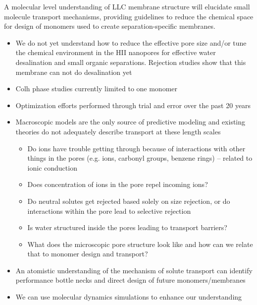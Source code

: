 \documentclass{article}
\begin{document}
	A molecular level understanding of LLC membrane structure will elucidate small molecule transport mechanisms, providing guidelines to reduce the chemical space for design of monomers used to create separation-specific membranes.
	\begin{itemize}
                \item We do not yet understand how to reduce the effective pore size and/or tune the chemical environment in the HII nanopores for effective water desalination and small organic separations. Rejection studies show that this membrane can not do desalination yet
		\item Colh phase studies currently limited to one monomer
                \item Optimization efforts performed through trial and error over the past 20 years
                \item Macroscopic models are the only source of predictive modeling and existing theories do not adequately describe transport at these length scales
                \begin{itemize}
                        \item Do ions have trouble getting through because of interactions with other things in the pores (e.g. ions, carbonyl groups, benzene rings) -- related to ionic conduction
                        \item Does concentration of ions in the pore repel incoming ions?
                        \item Do neutral solutes get rejected based solely on size rejection, or do interactions within the pore lead to selective rejection
                        \item Is water structured inside the pores leading to transport barriers?
			\item What does the microscopic pore structure look like and how can we relate that to monomer design and transport?
		\end{itemize}
		\item An atomistic understanding of the mechanism of solute transport can identify performance bottle necks and direct design of future monomers/membranes
		\item We can use molecular dynamics simulations to enhance our understanding 
	\end{itemize}
	 
\end{document}
